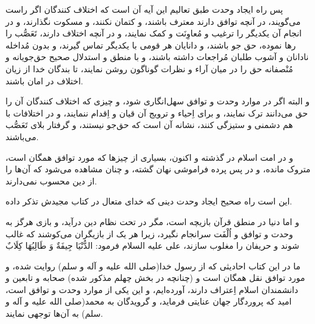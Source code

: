 پس راه ایجاد وحدت طبق تعالیم این آیه آن است که اختلاف کنندگان اگر راست
می‌گویند، در آنچه توافق دارند معترف باشند، و کتمان نکنند، و مسکوت
نگذارند، و در انجام آن یکدیگر را ترغیب و مُعاوِنَت و کمک نمایند، و در
آنچه اختلاف دارند، تَعَصُّب را رها نموده، حق جو باشند، و دانایان هر قومی
با یکدیگر تماس گیرند، و بدون مُداخله نادانان و آشوب طلبان مُراجعات داشته
باشند، و با منطق و استدلال صحیح حق‌جویانه و مُنْصفانه حق را در میان آراء
و نظرات گوناگون روشن نمایند، تا بندگان خدا از زیان اختلاف در امان
باشند.

و البته اگر در موارد وحدت و توافق سهل‌انگاری شود، و چیزی که اختلاف
کنندگان آن را حق می‌دانند ترک نمایند، و برای اِحیاء و ترویج آن قیان و
اِقدام ننمایند، و در اختلافات با هم دشمنی و ستیزگی کنند، نشانه آن است
که حق‌جو نیستند، و گرفتار بلای تَعَصُّب می‌باشند.

و در امت اسلام در گذشته و اکنون، بسیاری از چیزها که مورد توافق همگان
است، متروک مانده، و در پس پرده فراموشی نهان گشته، و چنان مشاهده می‌شود
که آن‌ها را از دین محسوب نمی‌دارند.

این است راه صحیح ایجاد وحدت دینی که خدای متعال در کتاب مجیدش تذکر داده.

و اما دنیا در منطق قرآن بازیچه است، مگر در تحت نظام دین درآید، و بازی
هرگز به وحدت و توافق و اُلْفَت سرانجام نگیرد، زیرا هر یک از بازیگران
می‌کوشند که غالب شوند و حریفان را مغلوب سازند، علی علیه السلام فرمود:
الدُّنْيَا جِيفَةٌ وَ طَالِبُهَا كِلَابٌ

ما در این کتاب احادیثی که از رسول خدا(صلی الله علیه و آله و سلم) روایت
شده، و مورد توافق نقل همگان است و (چنانچه در بخش چهلم مذکور شده) صحابه
و تابعین و دانشمندان اسلام اِعتراف دارند، آورده‌ایم، و این یکی از موارد
وحدت و توافق است، امید که پروردگار جهان عنایتی فرماید، و گرویدگان به
محمد(صلی الله علیه و آله و سلم) به آن‌ها توجهی نمایند.

